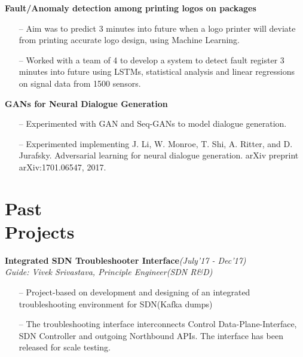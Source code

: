\documentclass[margin,line]{templates/resume}
\newcommand{\myhref}[3][blue]{\href{#2}{\color{#1}{#3}}}
\newcommand{\compresslist}{%
\setlength{\itemsep}{3pt}%
\setlength{\parskip}{0pt}%
\setlength{\parsep}{0pt}%
}
\begin{document}
\begin{resume}
\vspace{-0.2cm}    
\textsf{\textbf{Fault/Anomaly detection among printing logos on packages}} \hfill{\myhref[darkblue]{https://esha-singh.github.io/\#mpi}{Web}}
\normalsize
\vspace{0.05cm}
\begin{itemize}[leftmargin=*]\compresslist
  \item[--] Aim was to predict 3 minutes into future when a logo printer will deviate from printing accurate logo design, using Machine Learning.
\item[--] Worked with a team of 4 to develop a system to detect fault register 3 minutes into future using LSTMs, statistical analysis and linear regressions on signal data from 1500 sensors. 
\end{itemize}

\vspace{-0.2cm}    
\textsf{\textbf{GANs for Neural Dialogue Generation}} \hfill{\myhref[darkblue]{https://esha-singh.github.io/\#mpi}{Web}}
\normalsize
\vspace{0.05cm}
\begin{itemize}[leftmargin=*]\compresslist
  \item[--]Experimented with GAN and Seq-GANs to model dialogue generation.  
\item[--] Experimented implementing J. Li, W. Monroe, T. Shi, A. Ritter, and D. Jurafsky. Adversarial learning for neural dialogue generation. arXiv preprint arXiv:1701.06547, 2017.
\end{itemize}

\section{\mysidestyle Past\\Projects}
\textsf{\textbf{Integrated SDN Troubleshooter Interface}}\hfill\textit{\small(July'17 - Dec'17)}
\\ {\textit{Guide: {Vivek Srivastava, Principle Engineer(SDN R\&D)}}}\hfill{\myhref[darkblue]{https://esha-singh.github.io/\#mpi}{Web}}
\vspace{0.05cm}
\begin{itemize}[leftmargin=*]\compresslist
\item[--]Project-based on development and designing of an integrated troubleshooting environment for SDN(Kafka dumps)
\item[--]The troubleshooting interface interconnects Control Data-Plane-Interface, SDN Controller and outgoing Northbound APIs. The interface has been released for scale testing.
\end{itemize}


\end{resume}
\end{document}
